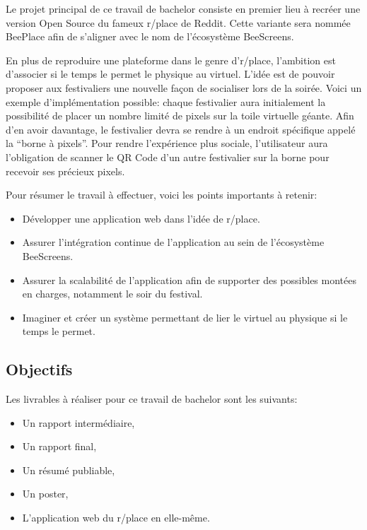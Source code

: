Le projet principal de ce travail de bachelor consiste en premier lieu à recréer une version Open Source du fameux r/place de Reddit. Cette variante sera nommée BeePlace afin de s'aligner avec le nom de l'écosystème BeeScreens.

En plus de reproduire une plateforme dans le genre d'r/place, l'ambition est d'associer si le temps le permet le physique au virtuel. L'idée est de pouvoir proposer aux festivaliers une nouvelle façon de socialiser lors de la soirée. Voici un exemple d'implémentation possible: chaque festivalier aura initialement la possibilité de placer un nombre limité de pixels sur la toile virtuelle géante. Afin d'en avoir davantage, le festivalier devra se rendre à un endroit spécifique appelé la “borne à pixels”. Pour rendre l'expérience plus sociale, l'utilisateur aura l'obligation de scanner le QR Code d'un autre festivalier sur la borne pour recevoir ses précieux pixels.

Pour résumer le travail à effectuer, voici les points importants à retenir:

\begin{itemize}
  \item Développer une application web dans l'idée de r/place.
  \item Assurer l'intégration continue de l'application au sein de l'écosystème BeeScreens.
  \item Assurer la scalabilité de l'application afin de supporter des possibles montées en charges, notamment le soir du festival.
  \item Imaginer et créer un système permettant de lier le virtuel au physique si le temps le permet.
\end{itemize}

\subsection{Objectifs}

Les livrables à réaliser pour ce travail de bachelor sont les suivants:

\begin{itemize}
  \item Un rapport intermédiaire,
  \item Un rapport final,
  \item Un résumé publiable,
  \item Un poster,
  \item L'application web du r/place en elle-même.
\end{itemize}

